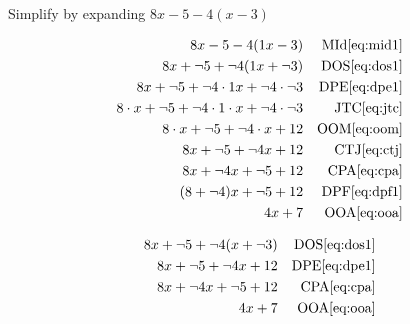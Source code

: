 \documentclass[20150903-160354-rs2.2-MarksMathNotebook.tex]{subfiles}
\begin{document}
\begin{example}[id:20141109-095536] \label{20141109-095536}  \hfill \\

Simplify by expanding $8x-5-4(x-3)$

\soln

\solnsteps
\begin{align*}
8x-5-4(1x-3) && \text{MId} \eqref{eq:mid1} \\
8x + \neg 5 + \neg 4(1x + \neg 3) && \text{DOS} \eqref{eq:dos1} \\
8x + \neg 5 + \neg 4 \cdot 1x + \neg 4 \cdot \neg 3 && \text{DPE} \eqref{eq:dpe1} \\
8 \cdot x + \neg 5 + \neg 4 \cdot 1 \cdot x + \neg 4 \cdot \neg 3 && \text{JTC} \eqref{eq:jtc} \\
8 \cdot x + \neg 5 + \neg 4 \cdot x + 12 && \text{OOM} \eqref{eq:oom} \\
8x + \neg 5 + \neg 4x + 12 && \text{CTJ} \eqref{eq:ctj} \\
8x + \neg 4x + \neg 5 + 12 && \text{CPA} \eqref{eq:cpa} \\
(8+\neg 4)x + \neg 5 + 12 && \text{DPF} \eqref{eq:dpf1} \\
4x + 7 && \text{OOA} \eqref{eq:ooa}
\end{align*}

\soln

\lesssteps
\begin{align*}
8x + \neg 5 + \neg 4(x+\neg 3) && \text{DOS} \eqref{eq:dos1} \\
8x + \neg 5 + \neg 4x + 12 && \text{DPE} \eqref{eq:dpe1} \\
8x + \neg 4x + \neg 5 + 12 && \text{CPA} \eqref{eq:cpa} \\
4x+7 && \text{OOA} \eqref{eq:ooa}
\end{align*}

\end{example}
\end{document}

